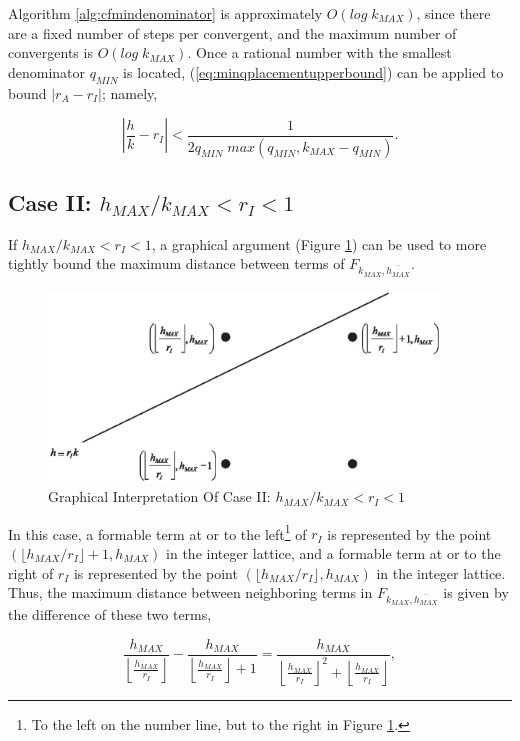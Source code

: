 \documentclass{esub2acm}
\begin{document}
Algorithm \ref{alg:cfmindenominator} is approximately $O(log \; k_{MAX})$,
since there are a fixed number of steps per convergent, and the maximum number
of convergents is $O(log \; k_{MAX})$.  Once a rational number with the smallest
denominator $q_{MIN}$ is located, (\ref{eq:minqplacementupperbound})
can be applied to bound $|r_A - r_I|$; namely,

\begin{equation}
\label{eq:qminmaxplacementerror}
\left| {\frac{h}{k} - r_I}  \right|
<
\frac{1}{2q_{MIN} \; max(q_{MIN}, k_{MAX} - q_{MIN})} .
\end{equation}


\subsection{Case II:  $h_{MAX}/k_{MAX} < r_I < 1$}
\label{subsec:caseii}

If $h_{MAX}/k_{MAX} < r_I < 1$, a graphical argument
(Figure \ref{fig:caseii}) can be used
to more tightly bound the maximum distance between terms of
$F_{k_{MAX}, \overline{h_{MAX}}}$.

\begin{figure}
\centering
\includegraphics[height=2.0in]{intlat03.eps}
\caption{Graphical Interpretation Of Case II:  $h_{MAX}/k_{MAX} < r_I < 1$}
\label{fig:caseii}
\end{figure}

In this case,  a formable term at or to the left\footnote{To the left on the
number line, but to the right in Figure \ref{fig:caseii}.}
of $r_I$ is represented by the point $(\lfloor h_{MAX}/r_I \rfloor + 1, h_{MAX} )$
in the integer lattice,
and a formable term at or to the right of $r_I$ is
represented by the point $(\lfloor h_{MAX}/r_I \rfloor, h_{MAX} )$
in the integer lattice.  Thus, the maximum distance between
neighboring terms in $F_{k_{MAX}, \overline{h_{MAX}}}$
is given by the difference of these two terms,

\begin{equation}
\frac{h_{MAX}}{\left\lfloor {\frac{h_{MAX}}{r_I}} \right\rfloor}
-
\frac{h_{MAX}}{\left\lfloor {\frac{h_{MAX}}{r_I}} \right\rfloor + 1}
=
\frac{h_{MAX}}{{\left\lfloor {\frac{h_{MAX}}{r_I}} \right\rfloor}^2
+ \left\lfloor {\frac{h_{MAX}}{r_I}} \right\rfloor},
\end{equation}
\end{document}
